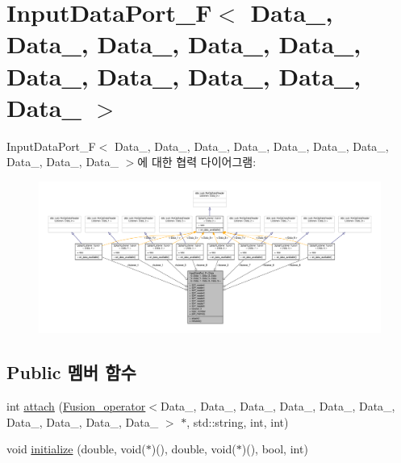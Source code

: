 \hypertarget{classInputDataPort__F}{}\section{Input\+Data\+Port\+\_\+F$<$ Data\+\_, Data\+\_, Data\+\_, Data\+\_, Data\+\_, Data\+\_, Data\+\_, Data\+\_, Data\+\_, Data\+\_ $>$}
\label{classInputDataPort__F}


Input\+Data\+Port\+\_\+F$<$ Data\+\_, Data\+\_, Data\+\_, Data\+\_, Data\+\_, Data\+\_, Data\+\_, Data\+\_, Data\+\_, Data\+\_ $>$에 대한 협력 다이어그램\+:\nopagebreak
\begin{figure}[H]
\begin{center}
\leavevmode
\includegraphics[width=350pt]{classInputDataPort__F__coll__graph}
\end{center}
\end{figure}
\subsection*{Public 멤버 함수}
\begin{DoxyCompactItemize}
\item 
int \hyperlink{classInputDataPort__F_a872e206ed74aca8952f23bcbb4973e58}{attach} (\hyperlink{classFusion__operator}{Fusion\+\_\+operator}$<$Data\+\_, Data\+\_, Data\+\_, Data\+\_, Data\+\_, Data\+\_, Data\+\_, Data\+\_, Data\+\_, Data\+\_ $>$ $\ast$, std\+::string, int, int)
\item 
void \hyperlink{classInputDataPort__F_a349a2f0ae2bf270a337e6db9e636b78b}{initialize} (double, void($\ast$)(), double, void($\ast$)(), bool, int)
\end{DoxyCompactItemize}
